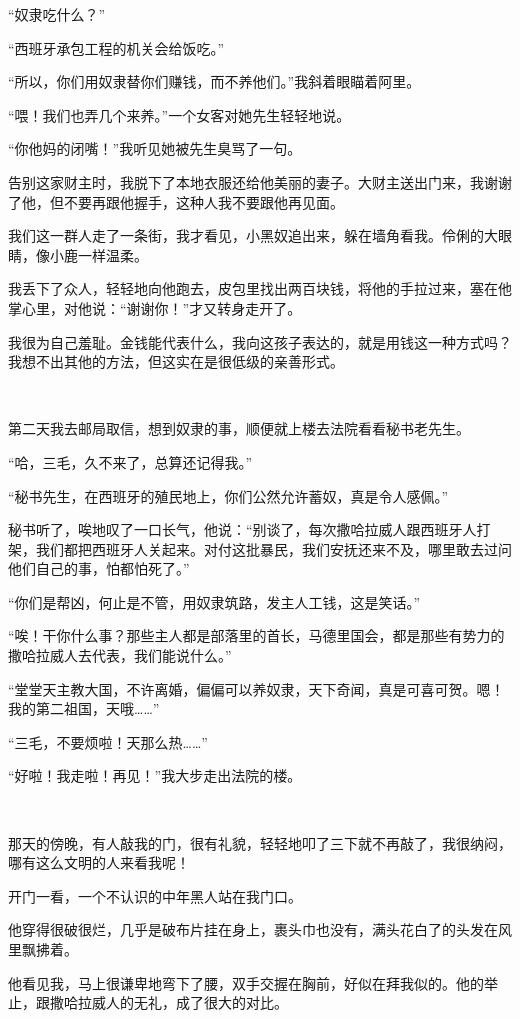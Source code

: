 \par “奴隶吃什么？”
\par “西班牙承包工程的机关会给饭吃。”
\par “所以，你们用奴隶替你们赚钱，而不养他们。”我斜着眼瞄着阿里。
\par “喂！我们也弄几个来养。”一个女客对她先生轻轻地说。
\par “你他妈的闭嘴！”我听见她被先生臭骂了一句。
\par 告别这家财主时，我脱下了本地衣服还给他美丽的妻子。大财主送出门来，我谢谢了他，但不要再跟他握手，这种人我不要跟他再见面。
\par 我们这一群人走了一条街，我才看见，小黑奴追出来，躲在墙角看我。伶俐的大眼睛，像小鹿一样温柔。
\par 我丢下了众人，轻轻地向他跑去，皮包里找出两百块钱，将他的手拉过来，塞在他掌心里，对他说：“谢谢你！”才又转身走开了。
\par 我很为自己羞耻。金钱能代表什么，我向这孩子表达的，就是用钱这一种方式吗？我想不出其他的方法，但这实在是很低级的亲善形式。
\par  
\par 第二天我去邮局取信，想到奴隶的事，顺便就上楼去法院看看秘书老先生。
\par “哈，三毛，久不来了，总算还记得我。”
\par “秘书先生，在西班牙的殖民地上，你们公然允许蓄奴，真是令人感佩。”
\par 秘书听了，唉地叹了一口长气，他说：“别谈了，每次撒哈拉威人跟西班牙人打架，我们都把西班牙人关起来。对付这批暴民，我们安抚还来不及，哪里敢去过问他们自己的事，怕都怕死了。”
\par “你们是帮凶，何止是不管，用奴隶筑路，发主人工钱，这是笑话。”
\par “唉！干你什么事？那些主人都是部落里的首长，马德里国会，都是那些有势力的撒哈拉威人去代表，我们能说什么。”
\par “堂堂天主教大国，不许离婚，偏偏可以养奴隶，天下奇闻，真是可喜可贺。嗯！我的第二祖国，天哦……”
\par “三毛，不要烦啦！天那么热……”
\par “好啦！我走啦！再见！”我大步走出法院的楼。
\par  
\par 那天的傍晚，有人敲我的门，很有礼貌，轻轻地叩了三下就不再敲了，我很纳闷，哪有这么文明的人来看我呢！
\par 开门一看，一个不认识的中年黑人站在我门口。
\par 他穿得很破很烂，几乎是破布片挂在身上，裹头巾也没有，满头花白了的头发在风里飘拂着。
\par 他看见我，马上很谦卑地弯下了腰，双手交握在胸前，好似在拜我似的。他的举止，跟撒哈拉威人的无礼，成了很大的对比。
